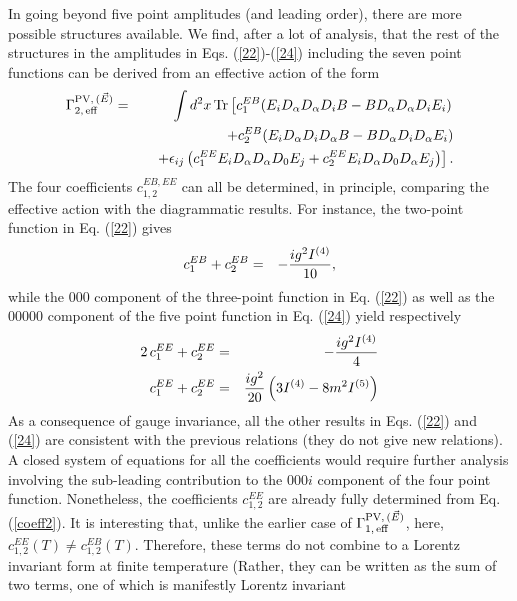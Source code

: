 \documentclass[a4paper,12pt]{article}
\begin{document}
In going beyond five point amplitudes (and leading order), there are
more possible structures available. We find,
after a lot of analysis, that the rest of the structures in the
amplitudes in Eqs. (\ref{22})-(\ref{24}) including the seven point
functions can be derived from an effective action of the form
\begin{eqnarray}
\Gamma_{2,\,{\rm eff}}^{{\rm PV},\,(\vec{E})} & = & \int d^{2}x\,{\rm
  Tr}\left[c_{1}^{EB}(E_{i}D_{\alpha}D_{\alpha}D_{i}B -
  BD_{\alpha}D_{\alpha}D_{i}E_{i})\right.\nonumber\\
 &  & \quad +
  c_{2}^{EB}(E_{i}D_{\alpha}D_{i}D_{\alpha}B -
  BD_{\alpha}D_{i}D_{\alpha}E_{i})\nonumber\\
 &  & \quad
  \left.+ \epsilon_{ij}\left(c_{1}^{EE}E_{i}D_{\alpha}D_{\alpha}D_{0}E_{j}
  + c_{2}^{EE}
  E_{i}D_{\alpha}D_{0}D_{\alpha}E_{j}\right)\right]\label{27}.
\end{eqnarray}
The four coefficients $c_{1,2}^{EB,EE}$ can all be determined, in principle,
comparing the effective action with the diagrammatic results. For instance,
the two-point function in Eq. (\ref{22}) gives
\begin{eqnarray}\label{coeff1}
c_{1}^{EB} + c_2^{EB} & = & -{ig^2 I^{(4)}\over 10},
\end{eqnarray}
while the $000$ component of the three-point function in Eq. (\ref{22}) as
well as the $00000$ component of the five point function in
Eq. (\ref{24}) yield respectively
\begin{eqnarray}\label{coeff2}
2\,c_{1}^{EE} + c_2^{EE} & = & -{ig^2 I^{(4)}\over 4} \nonumber \\
   c_{1}^{EE} + c_2^{EE} & = & {ig^2\over 20}\left(3 I^{(4)}-8 m^2
   I^{(5)}\right)
\label{28}
\end{eqnarray}
As a consequence of gauge invariance, all the other results in 
Eqs. (\ref{22}) and (\ref{24}) are consistent with the previous
relations (they do not give new relations).
A closed system of equations for all the coefficients would require
further analysis involving the sub-leading contribution to 
the $000i$ component of the four point function. Nonetheless, 
the coefficients $c_{1,2}^{EE}$ are already fully determined
from Eq. (\ref{coeff2}). It is interesting that, 
unlike the earlier case of $\Gamma_{1,\,{\rm eff}}^{{\rm PV},\,(\vec{E})}$, 
here,  $c_{1,2}^{EE}(T)\neq c_{1,2}^{EB}(T)$. 
Therefore, these terms do not combine to a Lorentz
invariant form at finite temperature (Rather, they can be written as
the sum of two terms, one of which is manifestly Lorentz invariant
\end{document}
